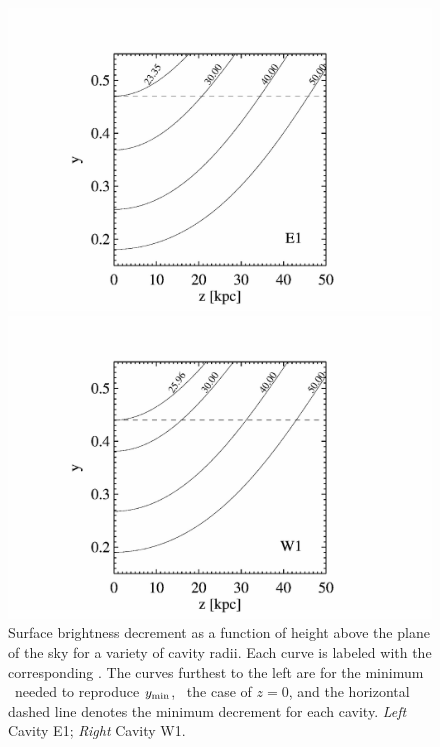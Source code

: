 \begin{figure}
  \begin{center}
    \begin{minipage}{0.495\linewidth}
      \includegraphics*[width=\textwidth, trim=25mm 0mm 40mm 10mm, clip]{arx_edec.eps}
    \end{minipage}
    \begin{minipage}{0.495\linewidth}
      \includegraphics*[width=\textwidth, trim=25mm 0mm 40mm 10mm, clip]{arx_wdec.eps}
    \end{minipage}
    \caption{Surface brightness decrement as a function of height
      above the plane of the sky for a variety of cavity radii. Each
      curve is labeled with the corresponding \rlos. The curves
      furthest to the left are for the minimum \rlos\ needed to
      reproduce $y_{\rm{min}}$, \ie\ the case of $z = 0$, and the
      horizontal dashed line denotes the minimum decrement for each
      cavity. {\it{Left}} Cavity E1; {\it{Right}} Cavity W1.}
    \label{fig:decs}
  \end{center}
\end{figure}



